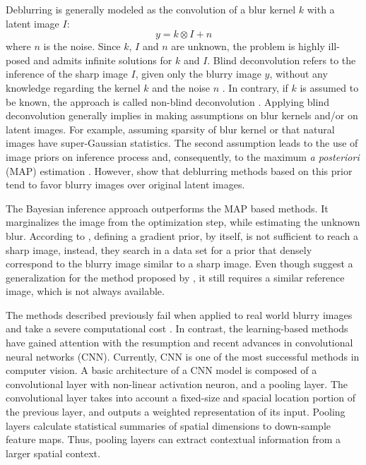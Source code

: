 \documentclass[journal]{IEEEtran}
\begin{document}
Deblurring is generally modeled as the convolution of a blur kernel $k$
with a latent image $I$: 
\begin{equation}
 y = k \otimes I + n
 \label{eq:deblurr}
\end{equation}
where $n$ is the noise. Since $k$, $I$ and $n$ are unknown, the problem 
is highly ill-posed and admits infinite solutions for $k$ and $I$.
Blind deconvolution refers to the inference of the sharp image $I$,
given only the blurry image $y$, without any knowledge regarding the
kernel $k$ and the noise $n$ \cite{Zhang2013}. In contrary, if $k$
is assumed to be known, the approach is called non-blind deconvolution
\cite{Wang2009}.
Applying blind deconvolution generally implies in making assumptions
on blur kernels and/or on latent images. For example, assuming sparsity
of blur kernel or that natural images have super-Gaussian statistics.
The second assumption leads to the use of image priors on inference process
and, consequently, to the maximum \textit{a posteriori} (MAP) estimation
\cite{Babacan2012}. However, \cite{Levin} show that deblurring methods based
on this prior tend to favor blurry images over original latent images.

The Bayesian inference approach \cite{Levin} outperforms the MAP based
methods. It marginalizes the image from the optimization step, while
estimating the unknown blur. 
According to \cite{Hacohen13}, defining a gradient prior, by itself,
is not sufficient to reach a sharp image, instead, they search in a data
set for a prior that densely correspond to the blurry image similar
to a sharp image. Even though \cite{Pan2014} suggest a generalization
for the method proposed by \cite{Hacohen13}, it still requires a similar
reference image, which is not always available.

The methods described previously fail when applied to real world
blurry images \cite{Lai2016} and take a severe computational cost
\cite{Chakrabarti2016}. In contrast, the learning-based methods
have gained attention with the resumption and recent advances in
convolutional neural networks (CNN). 
Currently, CNN is one of the most successful methods in computer vision.
A basic architecture of a CNN model is composed of a convolutional layer
with non-linear activation neuron, and a pooling layer.
The convolutional layer takes into account a fixed-size and spacial
location portion of the previous layer, and outputs
a weighted representation of its input.
Pooling layers calculate statistical summaries of spatial dimensions
to down-sample feature maps. Thus, pooling layers can extract
contextual information from a larger spatial context.
\end{document}
